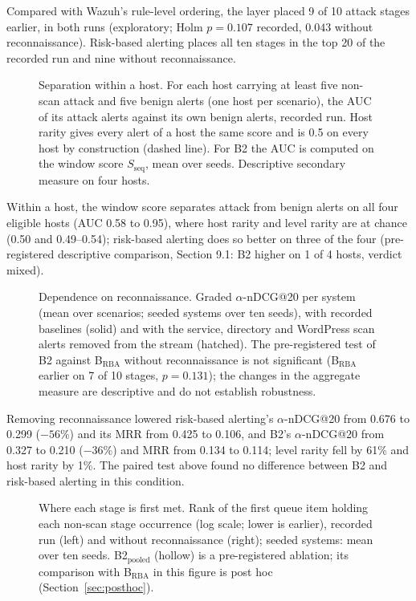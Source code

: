 \documentclass[10pt,a4paper]{article}
\begin{document}
Compared with Wazuh's rule-level ordering, the layer placed 9 of 10 attack stages earlier, in both runs (exploratory; Holm $p = 0.107$ recorded, $0.043$ without reconnaissance). Risk-based alerting places all ten stages in the top 20 of the recorded run and nine without reconnaissance.

\begin{figure}[h]
\centering

\caption{Separation within a host. For each host carrying at least five non-scan attack and five benign alerts (one host per scenario), the AUC of its attack alerts against its own benign alerts, recorded run. Host rarity gives every alert of a host the same score and is 0.5 on every host by construction (dashed line). For B2 the AUC is computed on the window score $S_\mathrm{seq}$, mean over seeds. Descriptive secondary measure on four hosts.}
\label{fig:withinhost}
\end{figure}

Within a host, the window score separates attack from benign alerts on all four eligible hosts (AUC 0.58 to 0.95), where host rarity and level rarity are at chance (0.50 and 0.49--0.54); risk-based alerting does so better on three of the four (pre-registered descriptive comparison, Section 9.1: B2 higher on 1 of 4 hosts, verdict mixed).

\begin{figure}[h]
\centering

\caption{Dependence on reconnaissance. Graded $\alpha$-nDCG@20 per system (mean over scenarios; seeded systems over ten seeds), with recorded baselines (solid) and with the service, directory and WordPress scan alerts removed from the stream (hatched). The pre-registered test of B2 against B$_\mathrm{RBA}$ without reconnaissance is not significant (B$_\mathrm{RBA}$ earlier on 7 of 10 stages, $p = 0.131$); the changes in the aggregate measure are descriptive and do not establish robustness.}
\label{fig:recon}
\end{figure}

Removing reconnaissance lowered risk-based alerting's $\alpha$-nDCG@20 from 0.676 to 0.299 ($-56\%$) and its MRR from 0.425 to 0.106, and B2's $\alpha$-nDCG@20 from 0.327 to 0.210 ($-36\%$) and MRR from 0.134 to 0.114; level rarity fell by 61\% and host rarity by 1\%. The paired test above found no difference between B2 and risk-based alerting in this condition.

\begin{figure}[h]
\centering

\caption{Where each stage is first met. Rank of the first queue item holding each non-scan stage occurrence (log scale; lower is earlier), recorded run (left) and without reconnaissance (right); seeded systems: mean over ten seeds. B2$_\mathrm{pooled}$ (hollow) is a pre-registered ablation; its comparison with B$_\mathrm{RBA}$ in this figure is post hoc (Section~\ref{sec:posthoc}).}
\label{fig:firstrank}
\end{figure}
\end{document}
